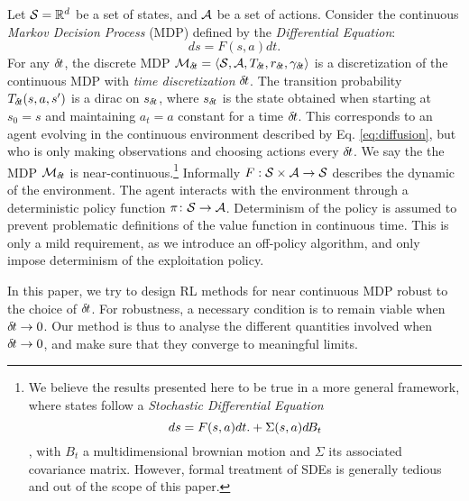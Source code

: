       
        Let ${\cal S} = \mathbb{R}^d$ be a set of states, and ${\cal A}$ be a set of
	actions. Consider the continuous \emph{Markov Decision Process} (MDP) defined by the \emph{Differential Equation}: %
        \begin{equation}
		\label{eq:diffusion}
		ds = F(s, a)dt. %
              \end{equation}
        For any ${\delta\hspace{-.1em}t}$, the discrete MDP ${\cal
	M}_{\delta\hspace{-.1em}t} = \langle {\cal S}, {\cal A}, T_{{\delta\hspace{-.1em}t}}, r_{\delta\hspace{-.1em}t},
      \gamma_{\delta\hspace{-.1em}t}\rangle$ is a discretization of the continuous MDP with
      \emph{time discretization} ${\delta\hspace{-.1em}t}$. The transition probability
      $T_{\delta\hspace{-.1em}t}(s, a, s')$ is a dirac on $s_{\delta\hspace{-.1em}t}$, where $s_{\delta\hspace{-.1em}t}$ is the
      state obtained
      when starting at $s_0 = s$ and maintaining $a_t=a$ constant for a time
      ${\delta\hspace{-.1em}t}$.
      This corresponds to an agent evolving in the continuous
      environment described by Eq. \eqref{eq:diffusion}, but who is
      only making observations and choosing actions every ${\delta\hspace{-.1em}t}$. We
      say the the MDP ${\cal M}_{\delta\hspace{-.1em}t}$ is near-continuous.\footnote{
	      We believe the results presented here to be true in a more general framework, where states
	      follow a \emph{Stochastic Differential Equation} \begin{equation}
		      ds = F(s, a)dt.  + \Sigma(s, a)d\hspace{-.1em}B_t
		      \label{eq:sde}
      \end{equation}, with
	      $B_t$ a multidimensional brownian motion and $\Sigma$ its associated covariance matrix. However,
      formal treatment of SDEs is generally tedious and out of the scope of this paper.}
      Informally $F: {\cal S}\times{\cal A}\rightarrow {\cal S}$ describes
	the dynamic of the environment. The agent interacts with the environment through a deterministic policy function
	$\pi \colon {\cal S} \rightarrow {\cal A}$. Determinism of the policy is assumed to prevent problematic definitions
	of the value function in continuous time. This is only a mild requirement, as we introduce an off-policy algorithm,
	and only impose determinism of the exploitation policy.

        In this paper, we try to design RL methods for near continuous MDP
	robust to the choice of ${\delta\hspace{-.1em}t}$. For robustness, a necessary condition is to remain viable when ${\delta\hspace{-.1em}t} \rightarrow 0$. Our method is thus to analyse the different
	quantities involved when ${\delta\hspace{-.1em}t} \rightarrow 0$, and make sure that they converge to meaningful limits.

